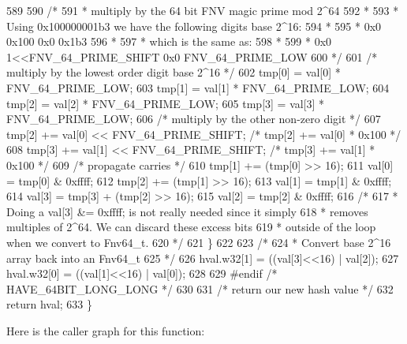 \begin{DoxyCode}
589 
590         \textcolor{comment}{/*}
591 \textcolor{comment}{         * multiply by the 64 bit FNV magic prime mod 2^64}
592 \textcolor{comment}{         *}
593 \textcolor{comment}{         * Using 0x100000001b3 we have the following digits base 2^16:}
594 \textcolor{comment}{         *}
595 \textcolor{comment}{         *      0x0     0x100   0x0     0x1b3}
596 \textcolor{comment}{         *}
597 \textcolor{comment}{         * which is the same as:}
598 \textcolor{comment}{         *}
599 \textcolor{comment}{         *      0x0     1<<FNV\_64\_PRIME\_SHIFT   0x0     FNV\_64\_PRIME\_LOW}
600 \textcolor{comment}{         */}
601         \textcolor{comment}{/* multiply by the lowest order digit base 2^16 */}
602         tmp[0] = val[0] * FNV\_64\_PRIME\_LOW;
603         tmp[1] = val[1] * FNV\_64\_PRIME\_LOW;
604         tmp[2] = val[2] * FNV\_64\_PRIME\_LOW;
605         tmp[3] = val[3] * FNV\_64\_PRIME\_LOW;
606         \textcolor{comment}{/* multiply by the other non-zero digit */}
607         tmp[2] += val[0] << FNV\_64\_PRIME\_SHIFT; \textcolor{comment}{/* tmp[2] += val[0] * 0x100 */}
608         tmp[3] += val[1] << FNV\_64\_PRIME\_SHIFT; \textcolor{comment}{/* tmp[3] += val[1] * 0x100 */}
609         \textcolor{comment}{/* propagate carries */}
610         tmp[1] += (tmp[0] >> 16);
611         val[0] = tmp[0] & 0xffff;
612         tmp[2] += (tmp[1] >> 16);
613         val[1] = tmp[1] & 0xffff;
614         val[3] = tmp[3] + (tmp[2] >> 16);
615         val[2] = tmp[2] & 0xffff;
616         \textcolor{comment}{/*}
617 \textcolor{comment}{         * Doing a val[3] &= 0xffff; is not really needed since it simply}
618 \textcolor{comment}{         * removes multiples of 2^64.  We can discard these excess bits}
619 \textcolor{comment}{         * outside of the loop when we convert to Fnv64\_t.}
620 \textcolor{comment}{         */}
621     \}
622 
623     \textcolor{comment}{/*}
624 \textcolor{comment}{     * Convert base 2^16 array back into an Fnv64\_t}
625 \textcolor{comment}{     */}
626     hval.w32[1] = ((val[3]<<16) | val[2]);
627     hval.w32[0] = ((val[1]<<16) | val[0]);
628 
629 \textcolor{preprocessor}{#endif }\textcolor{comment}{/* HAVE\_64BIT\_LONG\_LONG */}\textcolor{preprocessor}{}
630 
631     \textcolor{comment}{/* return our new hash value */}
632     \textcolor{keywordflow}{return} hval;
633 \}
\end{DoxyCode}


Here is the caller graph for this function\+:


